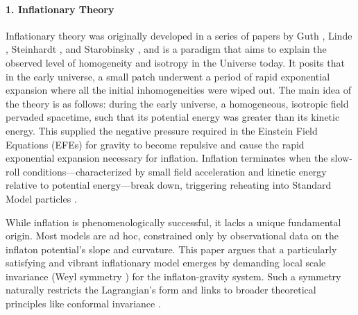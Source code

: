 \documentclass[aps,prd,reprint,preprintnumbers,showpacs,floatfix,nofootinbib,superscript address]{revtex4-2}
\newcommand{\wb}[1]{{\color[RGB]{255,0,0}{\textbf{\textit{[WB: #1]}}}}}
\begin{document}
\paragraph*{1. Inflationary Theory} Inflationary theory was originally developed in a series of papers by Guth \cite{GuthOriginalPaper}, Linde \cite{LINDE1982389}, Steinhardt 
\cite{PhysRevLett.48.1220}, and Starobinsky \cite{STAROBINSKY198099}, and is a paradigm that aims to explain the observed level of homogeneity and isotropy in the Universe today. It posits that in the early universe, a small patch underwent a period of rapid exponential expansion where all the initial inhomogeneities were wiped out. The main idea of the theory is as follows: during the early universe, a homogeneous, isotropic field pervaded spacetime, such that its potential energy was greater than its kinetic energy. This supplied the negative pressure required in the Einstein Field Equations (EFEs) \cite{einstein1915feldgleichungen} for gravity to become repulsive and cause the rapid exponential expansion necessary for inflation. Inflation terminates when the slow-roll conditions—characterized by small field acceleration and kinetic energy relative to potential energy—break down, triggering reheating into Standard Model particles \cite{Mukhanov:2005sc}.

While inflation is phenomenologically successful, it lacks a unique fundamental origin. Most models are ad hoc, constrained only by observational data on the inflaton potential’s slope and curvature. This paper argues that a particularly satisfying and vibrant inflationary model emerges by demanding local scale invariance (Weyl symmetry \cite{weyl_reine_1918}) for the inflaton-gravity system. Such a symmetry naturally restricts the Lagrangian’s form and links to broader theoretical principles like conformal invariance \cite{francesco_conformal_1997}.

\end{document}
